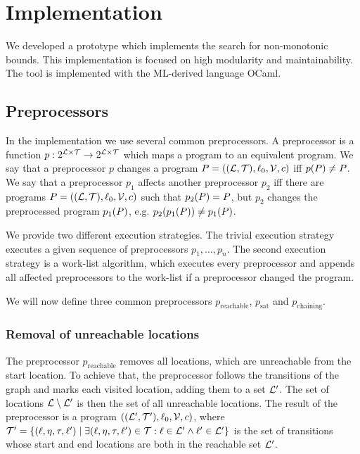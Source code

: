 \section{Implementation}

We developed a prototype which implements the search for non-monotonic bounds.
This implementation is focused on high modularity and maintainability.
The tool is implemented with the ML-derived language OCaml.

\subsection{Preprocessors}

In the implementation we use several common preprocessors.
A preprocessor is a function $p: 2^{\mathcal{L} \times \mathcal{T}} \rightarrow 2^{\mathcal{L} \times \mathcal{T}}$ which maps a program to an equivalent program.
We say that a preprocessor $p$ changes a program $P = ((\mathcal{L}, \mathcal{T}), \ell_0, \mathcal{V}, c)$ iff $p(P) \neq P$.
We say that a preprocessor $p_1$ affects another preprocessor $p_2$ iff there are programs $P = ((\mathcal{L}, \mathcal{T}), \ell_0, \mathcal{V}, c)$ such that $p_2(P) = P$, but $p_2$ changes the preprocessed program $p_1(P)$, e.g. $p_2(p_1(P)) \neq p_1(P)$.

We provide two different execution strategies.
The trivial execution strategy executes a given sequence of preprocessors $p_1, \dots, p_n$.
The second execution strategy is a work-list algorithm, which executes every preprocessor and appends all affected preprocessors to the work-list if a preprocessor changed the program.

We will now define three common preprocessors $p_{\text{reachable}}$, $p_{\text{sat}}$ and $p_{\text{chaining}}$.

\subsubsection{Removal of unreachable locations}

The preprocessor $p_{\text{reachable}}$ removes all locations, which are unreachable from the start location.
To achieve that, the preprocessor follows the transitions of the graph and marks each visited location, adding them to a set $\mathcal{L}'$.
The set of locations $\mathcal{L} \setminus \mathcal{L}'$ is then the set of all unreachable locations.
The result of the preprocessor is a program $((\mathcal{L}', \mathcal{T}'), \ell_0, \mathcal{V}, c)$, where $\mathcal{T}' = \lbrace (\ell,\eta,\tau,\ell') \mid \exists (\ell,\eta,\tau,\ell') \in \mathcal{T}: \ell \in \mathcal{L}' \wedge \ell' \in \mathcal{L}' \rbrace$ is the set of transitions whose start and end locations are both in the reachable set $\mathcal{L}'$.

